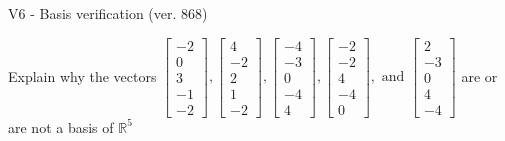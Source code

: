 \begin{exercise}
  \begin{exerciseTitle}V6 - Basis verification (ver. 868)\end{exerciseTitle}
  \begin{exerciseStatement}
    Explain why the vectors \(\left[\begin{array}{r}
-2 \\
0 \\
3 \\
-1 \\
-2
\end{array}\right] , \left[\begin{array}{r}
4 \\
-2 \\
2 \\
1 \\
-2
\end{array}\right] , \left[\begin{array}{r}
-4 \\
-3 \\
0 \\
-4 \\
4
\end{array}\right] , \left[\begin{array}{r}
-2 \\
-2 \\
4 \\
-4 \\
0
\end{array}\right] , \text{ and } \left[\begin{array}{r}
2 \\
-3 \\
0 \\
4 \\
-4
\end{array}\right]\) are or are not a basis of \(\mathbb{R}^5\)	



\end{exerciseStatement}
\end{exercise}
